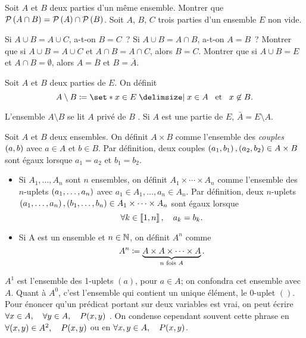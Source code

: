 \documentclass{magnoliaold}
\begin{document}
\begin{exos}
\exo Soit $A$ et $B$ deux parties d'un même ensemble. Montrer que
  $\mathcal{P}\left(A\cap B\right)=\mathcal{P}\left(A\right)\cap\mathcal{P}\left(B\right)$.
\exo Soit $A$, $B$, $C$ trois parties d'un ensemble $E$ non vide.
  \begin{questions}
  \question Si $A\cup B=A\cup C$, a-t-on $B=C$~?
  \question Si $A\cup B=A\cap B$, a-t-on $A=B$~?
  \question Montrer que si $A\cup B=A\cup C$ et $A\cap B=A\cap C$, alors $B=C$.
  \question Montrer que si $A\cup B=E$ et $A\cap B=\emptyset$, alors $A=\overline{B}$ et
  $B=\overline{A}$.
  \end{questions}
\end{exos}

\begin{definition}[utile=-3]
Soit $A$ et $B$ deux parties de $E$. On définit
\[A\setminus B\defeq\enstq{x\in E}{x\in A \et x\not\in B}.\]
\end{definition}

\begin{remarques}
\remarque L'ensemble $A\setminus B$ se lit \og $A$ privé de $B$ \fg.
\remarque Si $A$ est une partie de $E$, $\bar{A}=E\setminus A$.
\end{remarques}

\begin{definition}
Soit $A$ et $B$ deux ensembles. On définit $A\times B$ comme l'ensemble
des \emph{couples} $\left(a,b\right)$ avec $a\in A$ et $b\in B$. Par définition, deux couples
$\left(a_1,b_1\right), \left(a_2,b_2\right)\in A\times B$ sont égaux lorsque $a_1=a_2$ et $b_1=b_2$.
\end{definition}

\begin{definition}[utile=-3]
\begin{itemize}
\item Si $A_1,\ldots,A_n$ sont $n$ ensembles, on définit
  $A_1\times\cdots\times A_n$ comme l'ensemble des $n$-uplets
  $\left(a_1,\ldots,a_n\right)$ avec $a_1\in A_1,\ldots,a_n\in A_n$. Par définition, deux $n$-uplets
  $\left(a_1,\ldots,a_n\right), \left(b_1,\ldots,b_n\right)\in A_1\times\cdots\times A_n$ sont égaux lorsque
  \[\forall k\in\left\llbracket 1,n\right\rrbracket ,\quad a_k=b_k.\]
\item Si A est un ensemble et $n\in\mathbb{N}$, on définit $A^n$ comme
  \[A^n\coloneqq\underbrace{A\times A\times\cdots\times A}_{\text{$n$ fois $A$}}.\]
\end{itemize}
\end{definition}

\begin{remarques}
\remarque $A^1$ est l'ensemble des 1-uplets $(a)$, pour $a\in A$; on confondra cet
  ensemble avec $A$. Quant à $A^0$, c'est l'ensemble qui contient un unique élément,
  le $0$-uplet $()$.
\remarque Pour énoncer qu'un prédicat portant sur deux variables est vrai, on peut écrire
  \og $\forall x\in A,\quad \forall y\in A,\quad P(x,y)$ \fg.
  On condense cependant souvent cette phrase en \og $\forall (x,y)\in A^2,\quad P(x,y)$ \fg ou
  en \og $\forall x,y\in A,\quad P(x,y)$\fg.
\end{remarques}
\end{document}
